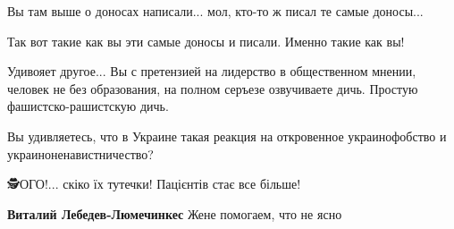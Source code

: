 \begin{itemize}
Вы там выше о доносах написали... мол, кто-то ж писал те самые доносы...

Так вот такие как вы эти самые доносы и писали. Именно такие как вы!

Удивояет другое... Вы с претензией на лидерство в общественном мнении, человек
не без образования, на полном серъезе озвучиваете дичь. Простую
фашистско-рашистскую дичь.

Вы удивляетесь, что в Украине такая реакция на откровенное украинофобство и украиноненавистничество?


🕵ОГО!... скіко їх тутечки! Пацієнтів стає все більше!


\begin{itemize}

\textbf{Виталий Лебедев-Люмечинкес} Жене помогаем, что не ясно
\end{itemize}

\end{itemize}

